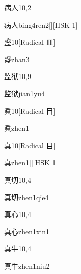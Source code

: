 \begin{entry}{病人}{10,2}
  \begin{phonetics}{病人}{bing4ren2}[][HSK 1]
  \end{phonetics}
\end{entry}

\begin{entry}{盏}{10}[Radical 皿]
  \begin{phonetics}{盏}{zhan3}
  \end{phonetics}
\end{entry}

\begin{entry}{监狱}{10,9}
  \begin{phonetics}{监狱}{jian1yu4}
  \end{phonetics}
\end{entry}

\begin{entry}{眞}{10}[Radical 目]
  \begin{phonetics}{眞}{zhen1}
  \end{phonetics}
\end{entry}

\begin{entry}{真}{10}[Radical 目]
  \begin{phonetics}{真}{zhen1}[][HSK 1]
  \end{phonetics}
\end{entry}

\begin{entry}{真切}{10,4}
  \begin{phonetics}{真切}{zhen1qie4}
  \end{phonetics}
\end{entry}

\begin{entry}{真心}{10,4}
  \begin{phonetics}{真心}{zhen1xin1}
  \end{phonetics}
\end{entry}

\begin{entry}{真牛}{10,4}
  \begin{phonetics}{真牛}{zhen1niu2}
  \end{phonetics}
\end{entry}


